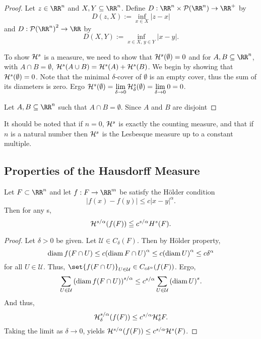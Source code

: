 \begin{proof}
	Let $z\in\RR^n$ and $X, Y\subseteq\RR^n$.
	Define $D:\RR^n\times\mathcal{P}(\RR^n)\rightarrow\RR^+$ by
	\[
		D(z,X) := \inf_{x\in X} |z-x|
	\]
	and $D:{\mathcal{P}(\RR^n)}^2\rightarrow\RR$ by
	\[
		D(X,Y) := \inf_{x\in X,\, y\in Y} |x-y|.
	\]

	To show $\mathcal{H}^s$ is a measure, we need to show that $\mathcal{H}^s(\emptyset)=0$ and for $A,B\subseteq\RR^n$, with $A\cap B=\emptyset$, $\mathcal{H}^s(A\cup B)=\mathcal{H}^s(A)+\mathcal{H}^s(B)$.
	We begin by showing that $\mathcal{H}^s(\emptyset)=0$.
	Note that the minimal $\delta$-cover of $\emptyset$ is an empty cover, thus the sum of its diameters is zero.
	Ergo $\mathcal{H}^s(\emptyset)=\lim\limits_{\delta\rightarrow 0} \mathcal{H}^s_\delta(\emptyset)=\lim\limits_{\delta\rightarrow 0} 0 =0$.

	Let $A,B\subseteq\RR^n$ such that $A\cap B=\emptyset$.
	Since $A$ and $B$ are disjoint

\end{proof}

It should be noted that if $n=0$, $\mathcal{H}^s$ is exactly the counting measure, and that if $n$ is a natural number then $\mathcal{H}^s$ is the Lesbesque measure up to a constant multiple.

\subsection{Properties of the Hausdorff Measure}

\begin{thm}\label{hm-holder}
	Let $F\subset\RR^n$ and let $f: F\rightarrow\RR^m$ be satisfy the H\"older condition
	\[
		|f(x)-f(y)| \leq c|x-y|^\alpha.
	\]
	Then for any s,
	\[
		\mathcal{H}^{s/\alpha}(f(F))\leqq c^{s/\alpha}H^s(F).
	\]
\end{thm}
\begin{proof}
	Let $\delta>0$ be given.
	Let $\mathcal{U}\in C_\delta(F)$.
	Then by H\"older property,
	\[
		\operatorname{diam} f(F\cap U)\leq c{(\operatorname{diam} F\cap U)}^\alpha \leq c{(\operatorname{diam} U)}^\alpha\leq c\delta^\alpha
	\]
	for all $U\in\mathcal{U}$.
	Thus, $\set{f(F\cap U)}_{U\in\mathcal U}\in C_{c\delta^\alpha}(f(F))$.
	Ergo,
	\[
		\sum_{U\in\mathcal{U}} {(\operatorname{diam} f(F\cap U))}^{s/\alpha}\leq c^{s/\alpha}\sum_{U\in\mathcal{U}}{(\operatorname{diam} U)}^s.
	\]
	And thus,
	\[
		\mathcal{H}^{s/\alpha}_\delta (f(F)) \leq c^{s/\alpha}\mathcal{H}^s_\delta F.
	\]
	Taking the limit as $\delta\rightarrow 0$, yields $\mathcal{H}^{s/\alpha}(f(F))\leq c^{s/\alpha}\mathcal{H}^s(F)$.
\end{proof}

